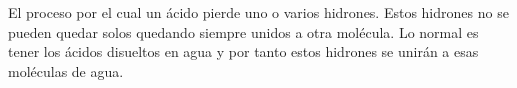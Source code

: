 \documentclass[12pt]{article}
\begin{document}

El proceso por el cual un ácido pierde uno o varios hidrones. Estos hidrones no se pueden quedar solos quedando siempre unidos a otra molécula. Lo normal es tener los ácidos disueltos en agua y por tanto estos hidrones se unirán a esas moléculas de agua.
\begin{center}
    \\
    \\
    \\
    \\
    \\
\end{center}

\end{document}

